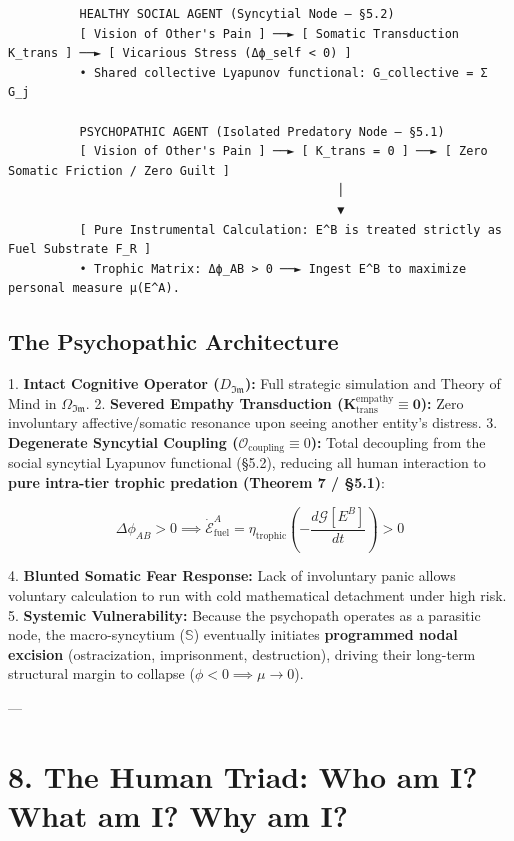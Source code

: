 \documentclass[11pt,a4paper]{article}
\theoremstyle{definition}
\theoremstyle{remark}
\begin{document}
\begin{verbatim}
          HEALTHY SOCIAL AGENT (Syncytial Node — §5.2)
          [ Vision of Other's Pain ] ──► [ Somatic Transduction K_trans ] ──► [ Vicarious Stress (Δϕ_self < 0) ]
          • Shared collective Lyapunov functional: G_collective = Σ G_j

          PSYCHOPATHIC AGENT (Isolated Predatory Node — §5.1)
          [ Vision of Other's Pain ] ──► [ K_trans = 0 ] ──► [ Zero Somatic Friction / Zero Guilt ]
                                              │
                                              ▼
          [ Pure Instrumental Calculation: E^B is treated strictly as Fuel Substrate F_R ]
          • Trophic Matrix: Δϕ_AB > 0 ──► Ingest E^B to maximize personal measure μ(E^A).
\end{verbatim}

\subsection{The Psychopathic Architecture}
1. \textbf{Intact Cognitive Operator ($D_{\mathfrak{Im}}$):} Full strategic simulation and Theory of Mind in $\Omega_{\mathfrak{Im}}$.
2. \textbf{Severed Empathy Transduction ($\mathbf{K}_{\text{trans}}^{\text{empathy}} \equiv \mathbf{0}$):} Zero involuntary affective/somatic resonance upon seeing another entity's distress.
3. \textbf{Degenerate Syncytial Coupling ($\mathcal{O}_{\text{coupling}} \equiv 0$):} Total decoupling from the social syncytial Lyapunov functional (§5.2), reducing all human interaction to \textbf{pure intra-tier trophic predation (Theorem 7 / §5.1)}:
   
\begin{equation}
\Delta \phi_{AB} > 0 \implies \dot{\mathcal{E}}_{\text{fuel}}^A = \eta_{\text{trophic}} \left( -\frac{d\mathcal{G}[E^B]}{dt} \right) > 0
\end{equation}

4. \textbf{Blunted Somatic Fear Response:} Lack of involuntary panic allows voluntary calculation to run with cold mathematical detachment under high risk.
5. \textbf{Systemic Vulnerability:} Because the psychopath operates as a parasitic node, the macro-syncytium ($\mathbb{S}$) eventually initiates \textbf{programmed nodal excision} (ostracization, imprisonment, destruction), driving their long-term structural margin to collapse ($\phi < 0 \implies \mu \to 0$).

---

\section{8. The Human Triad: Who am I? What am I? Why am I?}
\end{document}
